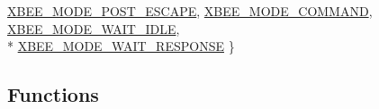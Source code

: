 \begin{DoxyCompactItemize}
\hyperlink{group__xbee__device_gga5015540d81fda839a15651ddb3fb411eafd910da7a43596621a12dcbce8410ffd}{X\-B\-E\-E\-\_\-\-M\-O\-D\-E\-\_\-\-P\-O\-S\-T\-\_\-\-E\-S\-C\-A\-P\-E}, 
\hyperlink{group__xbee__device_gga5015540d81fda839a15651ddb3fb411eaaa62d524055898fb85100bd2363a5802}{X\-B\-E\-E\-\_\-\-M\-O\-D\-E\-\_\-\-C\-O\-M\-M\-A\-N\-D}, 
\hyperlink{group__xbee__device_gga5015540d81fda839a15651ddb3fb411ea4fdf81a02970e7d090a88e16e32f8c3a}{X\-B\-E\-E\-\_\-\-M\-O\-D\-E\-\_\-\-W\-A\-I\-T\-\_\-\-I\-D\-L\-E}, 
\\*
\hyperlink{group__xbee__device_gga5015540d81fda839a15651ddb3fb411eaabd85cf9e660bddbe0782fb96d1b831b}{X\-B\-E\-E\-\_\-\-M\-O\-D\-E\-\_\-\-W\-A\-I\-T\-\_\-\-R\-E\-S\-P\-O\-N\-S\-E}
 \}
\end{DoxyCompactItemize}
\subsection*{Functions}
